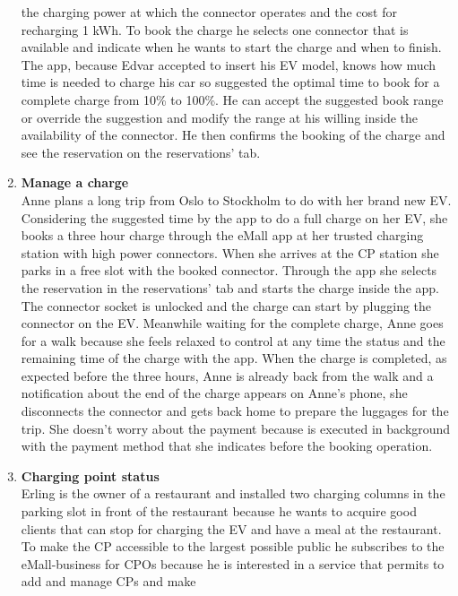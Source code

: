 \begin{enumerate}[label=\textbf{\Alph*}.]
            the charging power at which the connector operates and the cost for recharging 1 kWh.
            To book the charge he selects one connector that is available and indicate when he wants to start the charge
            and when to finish. The app, because Edvar accepted to insert his EV model, knows how much time is needed to charge his car so suggested
            the optimal time to book for a complete charge from 10\% to 100\%.
            He can accept the suggested book range or override the suggestion and modify the range at his willing inside the
            availability of the connector. He then confirms the booking of the charge and see the reservation on the reservations' tab.
      \item \textbf{Manage a charge} \\
            Anne plans a long trip from Oslo to Stockholm to do with her brand new EV.
            Considering the suggested time by the app to do a full charge on her EV, she books a three hour charge through the eMall
            app at her trusted charging station with high power connectors.
            When she arrives at the CP station she parks in a free slot with the booked connector. Through the app she selects
            the reservation in the reservations' tab and starts the charge inside the app. The connector socket is unlocked and
            the charge can start by plugging the connector on the EV. Meanwhile waiting for the complete charge, Anne goes for a walk
            because she feels relaxed to control at any time the status and the remaining time of the charge with the app. When the charge
            is completed, as expected before the three hours, Anne is already back from the walk and a notification about the end of the charge
            appears on Anne's phone, she disconnects the connector and gets back home to prepare the luggages for the trip. She doesn't worry about
            the payment because is executed in background with the payment method that she indicates before the booking operation.
      \item \textbf{Charging point status} \\
            Erling is the owner of a restaurant and installed two charging columns in the parking slot in front of the restaurant because
            he wants to acquire good clients that can stop for charging the EV and have a meal at the restaurant. To make the CP accessible to the largest
            possible public he subscribes to the eMall-business for CPOs because he is interested in a service that permits to add and manage CPs and make

\end{enumerate}
